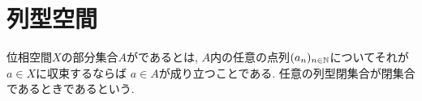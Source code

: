 \documentclass[uplatex, dvipdfmx, a4paper, 12pt, class=jsbook, crop=false]{standalone}
\begin{document}
\section{列型空間}
\label{sec:sequential-spaces}

\begin{definition}
	位相空間$ X $の部分集合$ A $がであるとは,
	$ A $内の任意の点列$ (a_n)_{n \in \mathbb{N}} $についてそれが$ a \in X $に収束するならば
	$ a \in A $が成り立つことである.
	任意の列型閉集合が閉集合であるときであるという.
\end{definition}
\end{document}
